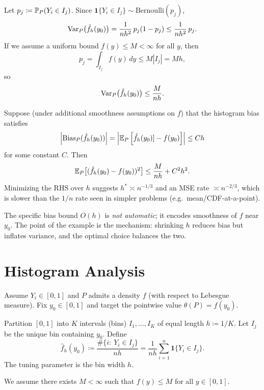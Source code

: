 \begin{remark}
	Let $p_j\coloneqq\P_P(Y_i\in I_j)$. Since $\mathbf 1\{Y_i\in I_j\}\sim \mathrm{Bernoulli}(p_j)$,
	\[
		\Var_P\!\big(\hat f_h(y_0)\big)
		=
		\frac{1}{n h^2}\,p_j(1-p_j)
		\le
		\frac{1}{n h^2}\,p_j.
	\]
	If we assume a uniform bound $f(y)\le M<\infty$ for all $y$, then
	\[
		p_j=\int_{I_j} f(y)\,dy \le M|I_j|=Mh,
	\]
	so
	\[
		\Var_P\!\big(\hat f_h(y_0)\big)\le \frac{M}{nh}.
	\]
\end{remark}

\begin{remark}
	Suppose (under additional smoothness assumptions on $f$) that the histogram bias satisfies
	\[
		\left|\mathrm{Bias}_P(\hat f_h(y_0))\right|
		=
		\left|\E_P\left[\hat f_h(y_0)]-f(y_0)\right]\right|
		\le C h
	\]
	for some constant $C$. Then
	\[
		\E_P\big[(\hat f_h(y_0)-f(y_0))^2\big]
		\le
		\frac{M}{nh}+C^2h^2.
	\]
	Minimizing the RHS over $h$ suggests $h^* \asymp n^{-1/3}$ and an MSE rate $\asymp n^{-2/3}$,
	which is slower than the $1/n$ rate seen in simpler problems (e.g.\ mean/CDF-at-a-point).
\end{remark}

\begin{aside}	The specific bias bound $O(h)$ is \emph{not automatic}; it encodes smoothness of $f$ near $y_0$.
	The point of the example is the mechanism: shrinking $h$ reduces bias but inflates variance, and the optimal
	choice balances the two.
\end{aside}


\section{Histogram Analysis}

Assume $Y_i\in[0,1]$ and $P$ admits a density $f$ (with respect to Lebesgue measure).
Fix $y_0\in[0,1]$ and target the pointwise value $\theta(P)=f(y_0)$.

\begin{definition}
	Partition $[0,1]$ into $K$ intervals (bins) $I_1,\dots,I_K$ of equal length $h\coloneqq1/K$.
	Let $I_j$ be the unique bin containing $y_0$. Define
	\[
		\hat f_h(y_0)
		\coloneqq
		\frac{\#\{i:\ Y_i\in I_j\}}{nh}
		=
		\frac{1}{nh}\sum_{i=1}^n \mathbf 1\{Y_i\in I_j\}.
	\]
	The tuning parameter is the bin width $h$.
\end{definition}

\begin{assumption}\label{ass:bounded}
	We assume there exists $M<\infty$ such that $f(y)\le M$ for all $y\in[0,1]$.
\end{assumption}

